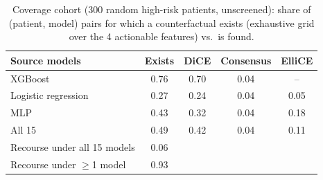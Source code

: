 \begin{table}[t]
\centering
\caption{Coverage cohort (300 random high-risk patients, unscreened): share of (patient, model) pairs for which a counterfactual exists (exhaustive grid over the 4 actionable features) vs.\ is found.}
\label{tab:coverage}
\footnotesize
\setlength{\tabcolsep}{3pt}
\begin{tabular}{lcccc}
\toprule
Source models & Exists & DiCE & Consensus & ElliCE \\
\midrule
XGBoost & 0.76 & 0.70 & 0.04 & -- \\
Logistic regression & 0.27 & 0.24 & 0.04 & 0.05 \\
MLP & 0.43 & 0.32 & 0.04 & 0.18 \\
All 15 & 0.49 & 0.42 & 0.04 & 0.11 \\
Recourse under all 15 models & 0.06 & & & \\
Recourse under $\geq$1 model & 0.93 & & & \\
\bottomrule
\end{tabular}
\end{table}
